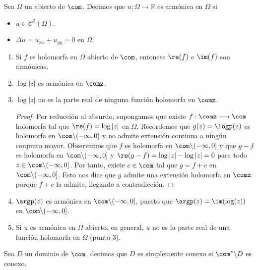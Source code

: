 \begin{defi}
Sea $\Omega$ un abierto de $\com$. Decimos que $u : \Omega \longrightarrow \mathbb{R}$ es armónica en $\Omega$ si
\begin{itemize}
    \item $u \in \mathscr{C}^2(\Omega)$.
    \item $\Delta u = u_{xx} + u_{yy} = 0$ en $\Omega$. 
\end{itemize}
\end{defi}

\begin{ejemplo}
\begin{enumerate}
    \item Si $f$ es holomorfa en $\Omega$ abierto de $\com$, entonces $\re(f)$ e $\im(f)$ son armónicas.
    \item $\log|z|$ es armónica en $\comz$.
    \item $\log|z|$ no es la parte real de ninguna función holomorfa en $\comz$.
    \begin{proof}
    Por reducción al absurdo, supongamos que existe $f : \comz \longrightarrow \com$ holomorfa tal que $\re(f) = \log|z|$ en $\Omega$.
    \newline
    Recordemos que $g(z) = \logp(z)$ es holomorfa en $\com \backslash (-\infty,0]$ y no admite extensión continua a ningún conjunto mayor.
    \newline
    Observamos que $f$ es holomorfa en $\com \backslash (-\infty,0]$ y que $g - f$ es holomorfa en $\com \backslash (-\infty,0]$ y $\re(g-f) = \log|z| - \log|z| = 0$ para todo $z \in \com \backslash (-\infty,0]$. Por tanto, existe $c \in \com$ tal que $g = f + c$ en $\com \backslash (-\infty,0]$. Esto nos dice que $g$ admite una extensión holomorfa en $\comz$ porque $f+c$ la admite, llegando a contradicción.
    \end{proof}
    \item $\argp(z)$ es armónica en $\com \backslash (-\infty,0]$, puesto que $\argp(z) = \im (\log(z))$ en $\com \backslash (-\infty,0]$.
    \item Si $u$ es armónica en $\Omega$ abierto, en general, $u$ no es la parte real de una función holomorfa en $\Omega$ (punto 3).
\end{enumerate}
\end{ejemplo}

\begin{defi}
Sea $D$ un dominio de $\com$, decimos que $D$ es simplemente conexo si $\com^* \backslash D$ es conexo.
\end{defi}

